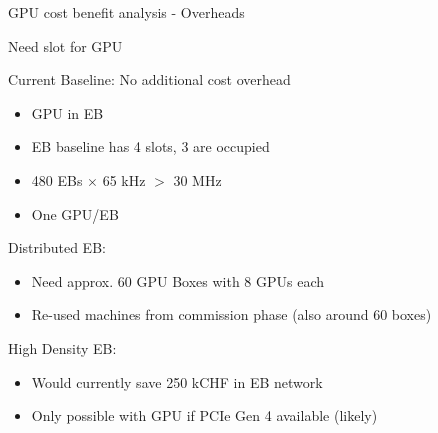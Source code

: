 \begin{frame}{GPU cost benefit analysis - Overheads}
\begin{tiny}
Need slot for GPU

Current Baseline: No additional cost overhead
\vspace{-10pt}
\begin{itemize}
\item GPU in EB
\item EB baseline has 4 slots, 3 are occupied
\item 480 EBs $\times$ 65 kHz $>$ 30 MHz
\item One GPU/EB
\end{itemize}

Distributed EB:
\vspace{-10pt}
\begin{itemize}
\item Need approx. 60 GPU Boxes with 8 GPUs each
\item Re-used machines from commission phase (also around 60 boxes)
\end{itemize}

High Density EB:
\vspace{-10pt}
\begin{itemize}
\item Would currently save 250 kCHF in EB network
\item Only possible with GPU if PCIe Gen 4 available (likely)
\end{itemize}
\end{tiny}
\end{frame}

